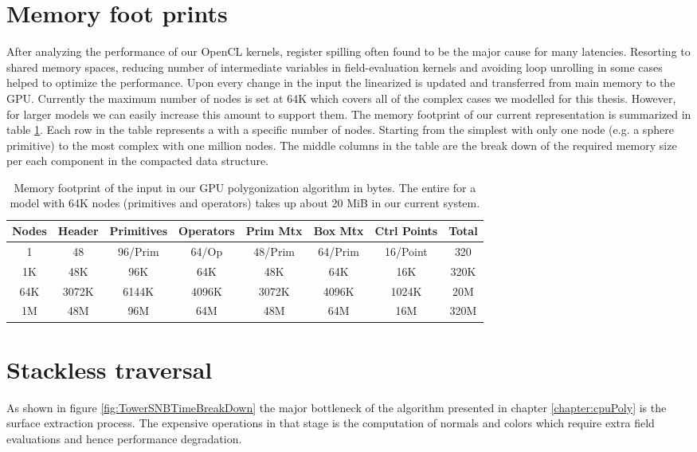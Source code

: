 \section{Memory foot prints}\label{sec:memory}
After analyzing the performance of our OpenCL kernels, register spilling often found to be the major 
cause for many latencies. Resorting to shared memory spaces, reducing number of intermediate variables 
in field-evaluation kernels and avoiding loop unrolling in some cases helped to optimize the performance. 
Upon every change in the input \blob the linearized \blob is updated and transferred from main memory 
to the GPU. Currently the maximum number of nodes is set at 64K which covers all of the complex cases 
we modelled for this thesis. However, for larger \blob models we can easily increase this amount to 
support them. The memory footprint of our current \blob representation is summarized in table 
\ref{table:memfootprint}. Each row in the table represents a \blob with a specific number of nodes.
Starting from the simplest \blob with only one node (e.g. a sphere primitive) to the most complex \blob 
with one million nodes. The middle columns in the table are the break down of the required memory 
size per each component in the compacted \blob data structure.

\begin{table}[H]
\begin{center}
	 \caption{\label{table:memfootprint}
  {Memory footprint of the input \blob in our GPU polygonization algorithm in bytes. The entire \blob for a model with 64K nodes (primitives and operators) 
  takes up about 20 MiB in our current system.}
}
  \begin{tabular}{ | c | c | c | c | c | c | c | c |}
    \hline    
    Nodes & Header & Primitives & Operators & Prim Mtx & Box Mtx & Ctrl Points & Total \\ \hline \hline
    1 & 48 & 96/Prim & 64/Op & 48/Prim & 64/Prim & 16/Point & 320 \\ \hline
    1K & 48K & 96K & 64K & 48K & 64K & 16K & 320K \\ \hline
    64K & 3072K & 6144K & 4096K & 3072K & 4096K & 1024K & 20M \\ \hline
    1M & 48M & 96M & 64M & 48M & 64M & 16M & 320M \\ 
    \hline
  	\end{tabular}
\end{center}
\end{table}


\section{Stackless \blob traversal}
\label{sec:stackless}
As shown in figure \ref{fig:TowerSNBTimeBreakDown} the major bottleneck of the algorithm presented in chapter 
\ref{chapter:cpuPoly} is the surface extraction process. The expensive operations in that 
stage is the computation of normals and colors which require extra field evaluations and hence performance degradation. 


